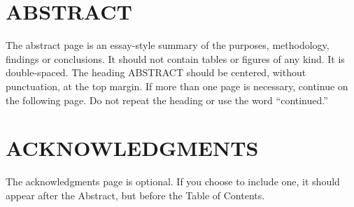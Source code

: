 \chapter*{ABSTRACT}

\indent The abstract page is an essay-style summary of the purposes, methodology, findings or conclusions. It should not contain tables or figures of any kind. It is double-spaced. The heading ABSTRACT should be centered, without punctuation, at the top margin. If more than one page is necessary, continue on the following page. Do not repeat the heading or use the word ``continued.''



\dedication{
If you wish to include a dedication, center it vertically on the page. You may center it horizontally as well, provided that it is no longer than a paragraph. There should be no heading on the dedication page. This is the only major section with no heading. Otherwise comment this part.
}


\newpage
{}
\chapter*{ACKNOWLEDGMENTS}

The acknowledgments page is optional. If you choose to include one, it should appear after the Abstract, but before the Table of Contents.

\newpage
